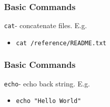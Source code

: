 \documentclass{beamer}
\newcommand{\code}[1]{\colorbox{codegray}{\texttt{#1}}}
\begin{document}
\begin{frame}
\frametitle{Basic Commands}
\code{cat}- concatenate files. E.g.
\bigskip
\begin{itemize}
    \item \code{cat /reference/README.txt}
\end{itemize}
\end{frame}


\begin{frame}
\frametitle{Basic Commands}
\code{echo}- echo back string. E.g.
\bigskip
\begin{itemize}
    \item \code{echo "Hello World"}
\end{itemize}
\end{frame}


%
%
%
%
%
%
%
%
\end{document}
